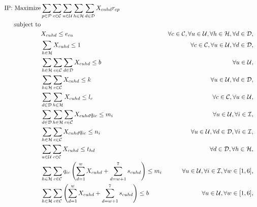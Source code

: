 \documentclass[11pt]{article}
\begin{document}
\begin{align}
\text{IP: }\text{Maximize} & \displaystyle
\sum\limits_{p\in \mathcal{P}}
\sum\limits_{c\in \mathcal{C}}
\sum\limits_{u\in \mathcal{U}}
\sum\limits_{h\in \mathcal{H}}
\sum\limits_{d\in \mathcal{D}}
X_{{c}{u}{h}{d}}  r_{{c}{p}} \label{mathmodel_obj}&
\\
\text{subject to} \notag\\
&X_{{c}{u}{h}{d}} \leq e_{{c}{u}}&\forall c \in \mathcal{C}, \forall u \in \mathcal{U}, \forall h \in \mathcal{H}, \forall d \in \mathcal{D}, \label{mathmodel_eligibility}&\\
&\sum\limits_{h\in\mathcal{H}}X_{{c}{u}{h}{d}} \leq 1 &\forall c \in \mathcal{C}, \forall u \in \mathcal{U}, \forall d \in \mathcal{D}, \label{mathmodel_singlechannel}&\\
&\sum\limits_{h\in\mathcal{H}}\sum\limits_{c\in\mathcal{C}}\sum\limits_{d\in\mathcal{D}}X_{{c}{u}{h}{d}} \leq b &\forall u \in \mathcal{U}, \label{mathmodel_percustomercommlimit}&\\
&\sum\limits_{h\in\mathcal{H}}\sum\limits_{c\in\mathcal{C}}X_{{c}{u}{h}{d}} \leq k &\forall u \in \mathcal{U}, \forall d \in \mathcal{D}, \label{mathmodel_percustomercommlimit_day}&\\
&\sum\limits_{d\in\mathcal{D}}\sum\limits_{h\in\mathcal{H}}X_{{c}{u}{h}{d}} \leq l_{c} &\forall c \in \mathcal{C}, \forall u \in \mathcal{U}, \label{mathmodel_percustomercamplimit}&\\
&\sum\limits_{d\in\mathcal{D}}\sum\limits_{h\in\mathcal{H}}\sum\limits_{c\in\mathcal{C}}X_{{c}{u}{h}{d}}  q_{{i}{c}} \leq m_{i} &\forall u \in \mathcal{U}, \forall i \in \mathcal{I}, \label{mathmodel_weeklyquotalimit}&\\
&\sum\limits_{h\in\mathcal{H}}\sum\limits_{c\in\mathcal{C}}X_{{c}{u}{h}{d}}  q_{{i}{c}} \leq n_{i} &\forall u \in \mathcal{U}, \forall d \in \mathcal{D}, \forall i \in \mathcal{I}, \label{mathmodel_dailyquotalimit}&\\
&\sum\limits_{u\in\mathcal{U}}\sum\limits_{c\in\mathcal{C}}X_{{c}{u}{h}{d}} \leq t_{{h}{d}} &\forall d \in \mathcal{D}, \forall h \in \mathcal{H}, \label{mathmodel_channellimit}&\\
&\sum\limits_{h\in\mathcal{H}}\sum\limits_{c\in\mathcal{C}}q_{{i}{c}}\left(\sum_{d=1}^{w}X_{{c}{u}{h}{d}} + \sum_{d=w+1}^{7}s_{{c}{u}{h}{d}}\right) \leq m_{i} &\forall u \in \mathcal{U}, \forall i \in \mathcal{I}, \forall w \in [1,6], \label{mathmodel_weeklyquotalimit_rh}&\\
&\sum\limits_{h\in\mathcal{H}}\sum\limits_{c\in\mathcal{C}}\left(\sum_{d=1}^{w}X_{{c}{u}{h}{d}} + \sum_{d=w+1}^{7}s_{{c}{u}{h}{d}}\right) \leq b &\forall u \in \mathcal{U}, \forall w \in [1,6], \label{mathmodel_percustomercommlimit_rh}&\\

\end{align}
\end{document}
